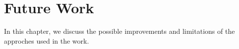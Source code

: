 \cleardoublepage

\chapter{Future Work}
\label{futureworkchapter}

In this chapter, we discuss the possible improvements and limitations of the approches used in the work.